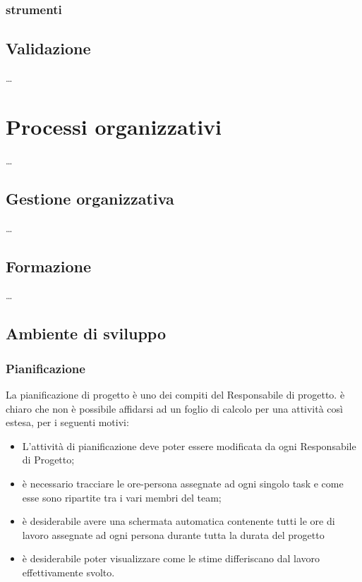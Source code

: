  \subsubsection{strumenti}

\subsection{Validazione} \dots




\section{Processi organizzativi} \dots

\subsection{Gestione organizzativa} \dots

\subsection{Formazione} \dots

\subsection{Ambiente di sviluppo} 

\subsubsection{Pianificazione}

La pianificazione di progetto è uno dei compiti del Responsabile di progetto. è chiaro che non è possibile affidarsi ad un foglio di calcolo per una attività così estesa, per i seguenti motivi:

\begin{itemize}
\item L'attività di pianificazione deve poter essere modificata da ogni Responsabile di Progetto;
\item è necessario tracciare le ore-persona assegnate ad ogni singolo task e come esse sono ripartite tra i vari membri del team;
\item è desiderabile avere una schermata automatica contenente tutti le ore di lavoro assegnate ad ogni persona durante tutta la durata del progetto
\item è desiderabile poter visualizzare come le stime differiscano dal lavoro effettivamente svolto.
\end{itemize}


